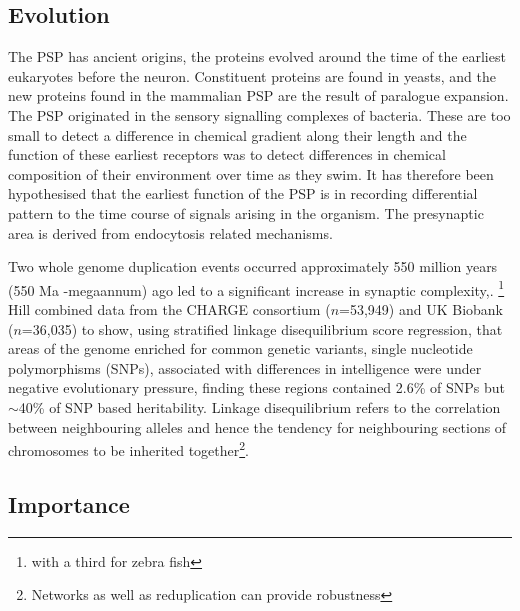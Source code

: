 \subsection{Evolution}
 The PSP has ancient origins, the proteins evolved around the time of the earliest eukaryotes before the neuron\cite{grant2018synaptomic}. Constituent proteins are found in yeasts, and the new proteins found in the mammalian PSP are the result of paralogue expansion\cite{grant2016molecular}. The PSP originated in the sensory signalling complexes of bacteria. These are too small to detect a difference in chemical gradient along their length and the function of these earliest receptors was to detect differences in chemical composition of their environment over time as they swim. It has therefore been hypothesised that the earliest function of the PSP is in recording differential pattern to the time course of signals arising in the organism. The presynaptic area is derived from endocytosis related mechanisms.

Two whole genome duplication events occurred approximately 550 million years (550 Ma -megaannum) ago led to a significant increase in synaptic complexity\cite{nithianantharajah2013synaptic},\cite{grant2016molecular}.
\footnote{with a third for zebra fish}
Hill combined data from the CHARGE consortium ($n$=53,949)\cite{davies2015genetic} and UK Biobank ($n$=36,035)\cite{davies2016genome} to show, using stratified linkage disequilibrium score regression\cite{finucane2015partitioning}, that areas of the genome enriched for common genetic variants, single nucleotide polymorphisms (SNPs), associated with differences in intelligence were under negative evolutionary pressure, finding these regions contained 2.6\% of SNPs but $\sim$40\% of SNP based heritability\cite{hill2016molecular}. Linkage disequilibrium refers to the correlation between neighbouring alleles and hence the tendency for neighbouring sections of chromosomes to be inherited together\cite{reich2001linkage}\footnote{Networks as well as reduplication can provide robustness}.

\subsection{Importance}

